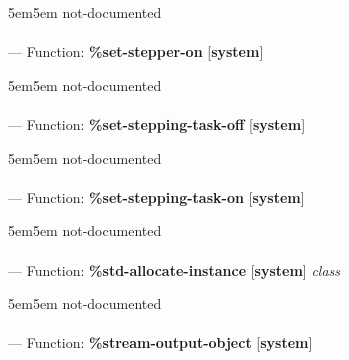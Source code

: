 \begin{adjustwidth}{5em}{5em}
not-documented
\end{adjustwidth}

\paragraph{}
\label{SYSTEM:SET-STEPPER-ON}
--- Function: \textbf{\%set-stepper-on} [\textbf{system}] \textit{}

\begin{adjustwidth}{5em}{5em}
not-documented
\end{adjustwidth}

\paragraph{}
\label{SYSTEM:SET-STEPPING-TASK-OFF}
--- Function: \textbf{\%set-stepping-task-off} [\textbf{system}] \textit{}

\begin{adjustwidth}{5em}{5em}
not-documented
\end{adjustwidth}

\paragraph{}
\label{SYSTEM:SET-STEPPING-TASK-ON}
--- Function: \textbf{\%set-stepping-task-on} [\textbf{system}] \textit{}

\begin{adjustwidth}{5em}{5em}
not-documented
\end{adjustwidth}

\paragraph{}
\label{SYSTEM:STD-ALLOCATE-INSTANCE}
--- Function: \textbf{\%std-allocate-instance} [\textbf{system}] \textit{class}

\begin{adjustwidth}{5em}{5em}
not-documented
\end{adjustwidth}

\paragraph{}
\label{SYSTEM:STREAM-OUTPUT-OBJECT}
--- Function: \textbf{\%stream-output-object} [\textbf{system}] \textit{}

